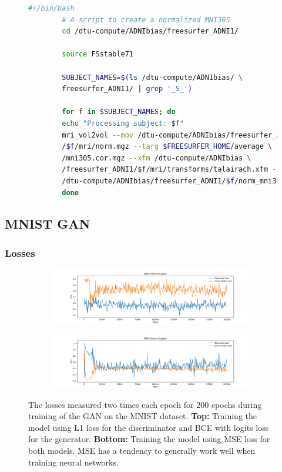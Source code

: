 \documentclass[12pt, fleqn, titlepage]{article}
\newcommand{\1}[1]{\mathds{1}\left[#1\right]}
\begin{document}
 \begin{figure}[H]
 	\scriptsize
 	\begin{lstlisting}[language=bash,caption={FreeSurfer mri\_vol2vol}]
		#!/bin/bash 
		# A script to create a normalized MNI305
		cd /dtu-compute/ADNIbias/freesurfer_ADNI1/
		
		source FSstable71
		
		SUBJECT_NAMES=$(ls /dtu-compute/ADNIbias/ \ 
		freesurfer_ADNI1/ | grep '_S_')
		
		for f in $SUBJECT_NAMES; do 
		echo "Processing subject: $f"
		mri_vol2vol --mov /dtu-compute/ADNIbias/freesurfer_ADNI1 \
		/$f/mri/norm.mgz --targ $FREESURFER_HOME/average \
		/mni305.cor.mgz --xfm /dtu-compute/ADNIbias \ 
		/freesurfer_ADNI1/$f/mri/transforms/talairach.xfm --o \
		/dtu-compute/ADNIbias/freesurfer_ADNI1/$f/norm_mni305.mgz
		done
 	\end{lstlisting}
 	\caption{}
 	\label{script2}
 \end{figure}


\subsection{MNIST GAN}\label{MNIST_GAN}

\subsubsection{Losses}

\begin{figure}[H]
	\centering
	\begin{subfigure}[b]{0.9\textwidth}
		\centering
		\includegraphics[width=\linewidth]{imgs/MNIST_GAN_normal_losses}
		\label{fig:MNIST_GAN_losses_normal}
	\end{subfigure}
	\hfill
	\begin{subfigure}[b]{0.9\textwidth}
		\centering
		\includegraphics[width=\linewidth]{imgs/MNIST_GAN_mse_losses}
		\label{fig:MNIST_GAN_losses_mse}
	\end{subfigure}
	\caption{The losses measured two times each epoch for 200 epochs during training of the GAN on the MNIST dataset. \textbf{Top:} Training the model using L1 loss for the discriminator and BCE with logits loss for the generator. \textbf{Bottom:} Training the model using MSE loss for both models. MSE has a tendency to generally work well when training neural networks.}
	\label{fig:MNIST_GAN_losses}
\end{figure}
\end{document}
